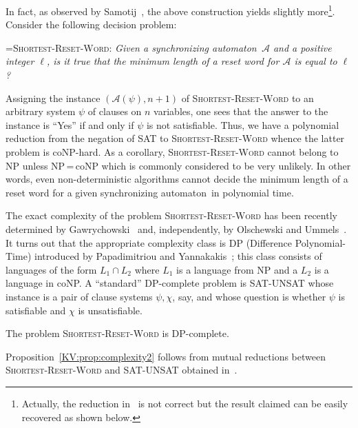 \documentclass{irmaart}
\newcommand{\san}{synchronizing au\-tom\-a\-ton}
\begin{document}
In fact, as observed by Samotij~\cite{Samotij:2007}, the above
construction yields slightly more\footnote{Actually, the reduction
in~\cite{Samotij:2007} is not correct but the result claimed can
be easily recovered as shown below.}. Consider the following
decision problem:

\smallskip

\hangindent=\parindent \noindent \textsc{Shortest-Reset-Word:}
\emph{Given a \san\ $\mathcal{A}$ and a positive integer $\ell$,
is it true that the minimum length of a reset word for
$\mathcal{A}$ is equal to $\ell$?}

\smallskip

\noindent Assigning the instance $(\mathcal{A}(\psi),n+1)$ of
\textsc{Shortest-Reset-Word} to an arbitrary system $\psi$ of
clauses on $n$ variables, one sees that the answer to the instance
is ``Yes'' if and only if $\psi$ is not satisfiable. Thus, we have
a polynomial reduction from the negation of \textsc{SAT} to
\textsc{Shortest-Reset-Word} whence the latter problem is
\textsf{coNP}-hard. As a corollary, \textsc{Shortest-Reset-Word}
cannot belong to \textsf{NP} unless \textsf{NP}\,=\,\textsf{coNP}
which is commonly considered to be very unlikely. In other words,
even non-deterministic algorithms cannot decide the minimum length
of a reset word for a given \san\ in polynomial time.

The exact complexity of the problem \textsc{Shortest-Reset-Word}
has been recently determined by
Gawrychowski~\cite{Gawrychowski:2008} and, independently, by
Olschewski and Ummels~\cite{Olschewski&Ummels:2010}. It turns out
that the appropriate complexity class is \textsf{DP}
(\textsf{Difference Polynomial-Time}) introduced by Papadimitriou
and Yannakakis~\cite{Papadimitriou&Yannakakis:1984}; this class
consists of languages of the form $L_1\cap L_2$ where $L_1$ is a
language from \textsf{NP} and a $L_2$ is a language in
\textsf{coNP}. A ``standard'' \textsf{DP}-complete problem is
\textsc{SAT-UNSAT} whose instance is a pair of clause systems
$\psi,\chi$, say, and whose question is whether $\psi$ is
satisfiable and $\chi$ is unsatisfiable.

\begin{proposition}
\label{KV:prop:complexity2} The problem
\textsc{Shortest-Reset-Word} is \textsf{DP}-complete.
\end{proposition}

Proposition~\ref{KV:prop:complexity2} follows from mutual
reductions between \textsc{Shortest-Reset-Word} and
\textsc{SAT-UNSAT} obtained
in~\cite{Gawrychowski:2008,Olschewski&Ummels:2010}.
\end{document}

